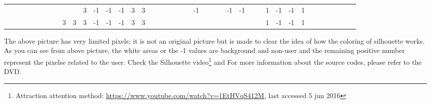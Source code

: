 \begin{table}[H]
{\begin{tabular}{ccccccccccccccccccccccccccccccccccccccccc}
   &    &                           &                           &                           &                           &                           &                           &                           &                           & \cellcolor[HTML]{3531FF}3 & -1                        & -1                        & -1                        & \cellcolor[HTML]{3531FF}3 & \cellcolor[HTML]{3531FF}3 &                           &                           &                           &                           &                           &                           & -1                        &    &    &    & -1                        & -1                        &                           &                           & \cellcolor[HTML]{329A9D}1 & -1                        & -1                        & \cellcolor[HTML]{329A9D}1 &                           &                           &                           &                           &  &  &  \\
   &    &                           &                           &                           &                           &                           &                           & \cellcolor[HTML]{3531FF}3 & \cellcolor[HTML]{3531FF}3 & \cellcolor[HTML]{3531FF}3 & -1                        & -1                        & -1                        & \cellcolor[HTML]{3531FF}3 & \cellcolor[HTML]{3531FF}3 &                           &                           &                           &                           &                           &                           &                           &    &    &    &                           &                           &                           &                           & \cellcolor[HTML]{329A9D}1 & -1                        & -1                        & \cellcolor[HTML]{329A9D}1 &                           &                           &                           &                           &  &  & 
\end{tabular}
}
\end{table}
The above picture has very limited pixels; it is not an original picture but is made to clear the idea of how the coloring of silhouette  works.
As you can see from above picture, the white areas or the -1 values are background and non-user and the remaining positive number represent the pixelse related to the user.
Check the Silhouette video\footnote{Attraction attention method: \url{https://www.youtube.com/watch?v=1EtHVqS412M}, last accessed 5 jun 2016} and For more information about the source codes, please refer to the DVD.


